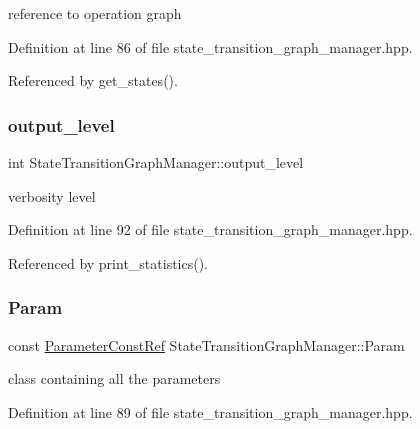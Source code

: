 reference to operation graph 



Definition at line 86 of file state\+\_\+transition\+\_\+graph\+\_\+manager.\+hpp.



Referenced by get\+\_\+states().

\mbox{\label{classStateTransitionGraphManager_a7549b027c2d5081cf5baa7dc53acdfb9}} 
\subsubsection{\texorpdfstring{output\+\_\+level}{output\_level}}
{\footnotesize\ttfamily int State\+Transition\+Graph\+Manager\+::output\+\_\+level\hspace{0.3cm}{\ttfamily [private]}}



verbosity level 



Definition at line 92 of file state\+\_\+transition\+\_\+graph\+\_\+manager.\+hpp.



Referenced by print\+\_\+statistics().

\mbox{\label{classStateTransitionGraphManager_ad88fd6f7ae6e825fca7c8ad9bb508203}} 
\subsubsection{\texorpdfstring{Param}{Param}}
{\footnotesize\ttfamily const \hyperlink{Parameter_8hpp_a37841774a6fcb479b597fdf8955eb4ea}{Parameter\+Const\+Ref} State\+Transition\+Graph\+Manager\+::\+Param\hspace{0.3cm}{\ttfamily [private]}}



class containing all the parameters 



Definition at line 89 of file state\+\_\+transition\+\_\+graph\+\_\+manager.\+hpp.

